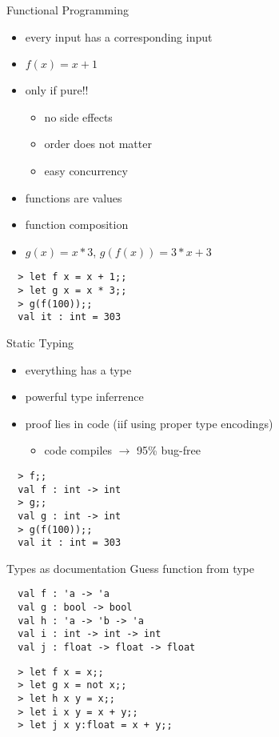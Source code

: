 \documentclass{beamer}
\begin{document}
\begin{frame}[fragile]{Functional Programming}
  \begin{itemize}
    \item every input has a corresponding input
    \item $ f(x) = x + 1$
    \pause
    \item only if pure!!
    \begin{itemize}
      \item no side effects
      \item order does not matter
      \item easy concurrency
    \end{itemize}
    \item functions are values
    \item function composition
    \item $g(x) = x * 3$, $g(f(x)) = 3 * x + 3$
  \end{itemize}
  \begin{verbatim}
  > let f x = x + 1;;
  > let g x = x * 3;;
  > g(f(100));;
  val it : int = 303
  \end{verbatim}
\end{frame}

\begin{frame}[fragile]{Static Typing}
  \begin{itemize}
    \item everything has a type
    \item powerful type inferrence
    \item proof lies in code (iif using proper type encodings)
    \begin{itemize}
      \item code compiles $\rightarrow$ 95\% bug-free
    \end{itemize}
  \end{itemize}
  \begin{verbatim}
  > f;;
  val f : int -> int
  > g;;
  val g : int -> int
  > g(f(100));;
  val it : int = 303
  \end{verbatim}
\end{frame}

\begin{frame}[fragile]{Types as documentation}
  Guess function from type

  \begin{verbatim}
  val f : 'a -> 'a
  val g : bool -> bool
  val h : 'a -> 'b -> 'a
  val i : int -> int -> int
  val j : float -> float -> float
  \end{verbatim}

  \pause

  \begin{verbatim}
  > let f x = x;;
  > let g x = not x;;
  > let h x y = x;;
  > let i x y = x + y;;
  > let j x y:float = x + y;;
  \end{verbatim}
\end{frame}
\end{document}
